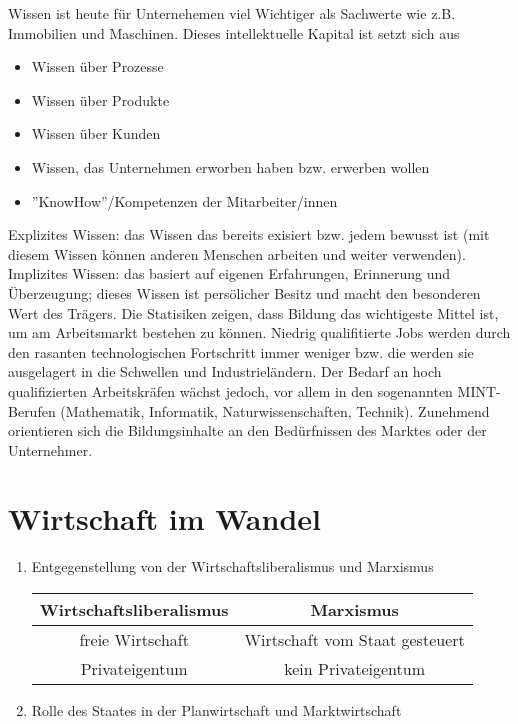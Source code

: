 \documentclass[a4paper]{report}
\begin{document}
Wissen ist heute für Unternehemen viel Wichtiger als Sachwerte wie z.B. Immobilien und Maschinen. Dieses intellektuelle Kapital ist setzt sich aus

\begin{itemize}
\item Wissen über Prozesse
\item Wissen über Produkte
\item Wissen über Kunden
\item Wissen, das Unternehmen erworben haben bzw. erwerben wollen
\item ''KnowHow''/Kompetenzen der Mitarbeiter/innen
\end{itemize}

Explizites Wissen: das Wissen das bereits exisiert bzw. jedem bewusst ist (mit diesem Wissen können anderen Menschen arbeiten und weiter verwenden).
\newline
\newline 
Implizites Wissen: das basiert auf eigenen Erfahrungen, Erinnerung und Überzeugung; dieses Wissen ist persölicher Besitz und macht den besonderen Wert des Trägers.
\newline
\newline
Die Statisiken zeigen, dass Bildung das wichtigeste Mittel ist, um am Arbeitsmarkt bestehen zu können. Niedrig qualifitierte Jobs werden durch den rasanten technologischen Fortschritt immer weniger bzw. die werden sie ausgelagert in die Schwellen und Industrieländern. Der Bedarf an hoch qualifizierten Arbeitskräfen wächst jedoch, vor allem in den sogenannten MINT-Berufen (Mathematik, Informatik, Naturwissenschaften, Technik). Zunehmend orientieren sich die Bildungsinhalte an den Bedürfnissen des Marktes oder der Unternehmer.
\newline

\chapter{Wirtschaft im Wandel}

\begin{enumerate}
\item Entgegenstellung von der Wirtschaftsliberalismus und Marxismus

\begin{tabular}{|c|c|}

\hline Wirtschaftsliberalismus & Marxismus
\\\hline freie Wirtschaft & Wirtschaft vom Staat gesteuert
\\Privateigentum & kein Privateigentum
\\\hline
\end{tabular}



\item Rolle des Staates in der Planwirtschaft und Marktwirtschaft


\end{enumerate}
\end{document}
